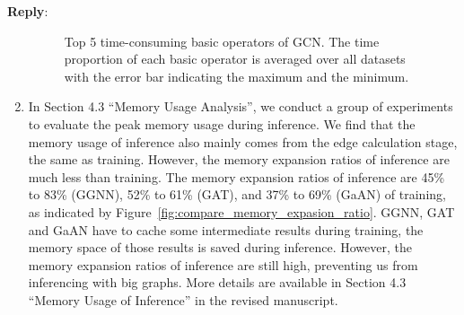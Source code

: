 \documentclass[12pt]{article}
\newenvironment{reply}
   {\medskip \noindent \textbf{Reply}:\  }
   {\medskip}
\begin{document}
\begin{reply}
\begin{enumerate}
    \begin{figure}[h]
        \centering
        \caption{Top 5 time-consuming basic operators of GCN. The time proportion of each basic operator is averaged over all datasets with the error bar indicating the maximum and the minimum.}
        \label{fig:compare_top_basic_operators}
    \end{figure}
    
    \item In Section 4.3 ``Memory Usage Analysis'', we conduct a group of experiments to evaluate the peak memory usage during inference.
    We find that the memory usage of inference also mainly comes from the edge calculation stage, the same as training.
    However, the memory expansion ratios of inference are much less than training.
    The memory expansion ratios of inference are 45\% to 83\% (GGNN), 52\% to 61\% (GAT), and 37\% to 69\% (GaAN) of training, as indicated by Figure~\ref{fig:compare_memory_expasion_ratio}.
    GGNN, GAT and GaAN have to cache some intermediate results during training, the memory space of those results is saved during inference.
    However, the memory expansion ratios of inference are still high, preventing us from inferencing with big graphs.
    More details are available in Section 4.3 ``Memory Usage of Inference'' in the revised manuscript.
    

\end{enumerate}
\end{reply}
\end{document}
